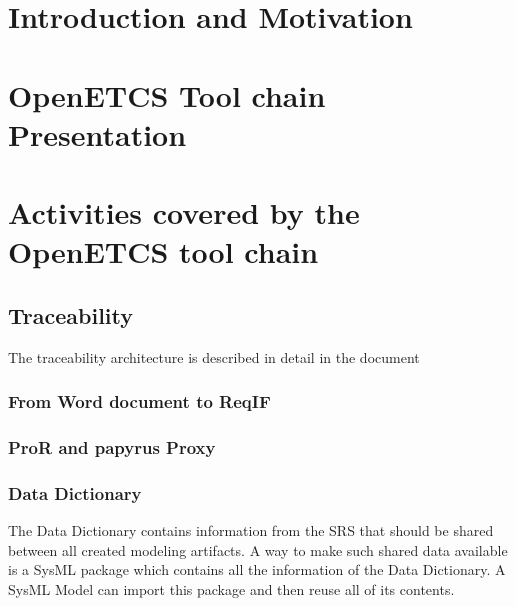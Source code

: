\documentclass{template/openetcs_report}
\begin{document}
\printglossary
\mainmatter
\chapter{Introduction and Motivation}



\chapter{OpenETCS Tool chain Presentation}
\label{chap:toolchaindef}




\chapter{Activities covered by the OpenETCS tool chain}
\label{chap:reqhandling}

  \section{Traceability}
The traceability architecture is described in detail in the document \cite{O7_trace}
    \subsection{From Word document to ReqIF}
    \subsection{ProR and papyrus Proxy}
    \subsection{Data Dictionary}

    The Data Dictionary contains information from the SRS that should
    be shared between all created modeling artifacts. A way to make
    such shared data available is a SysML package which contains all
    the information of the Data Dictionary. A SysML Model can import
    this package and then reuse all of its contents.
\end{document}
